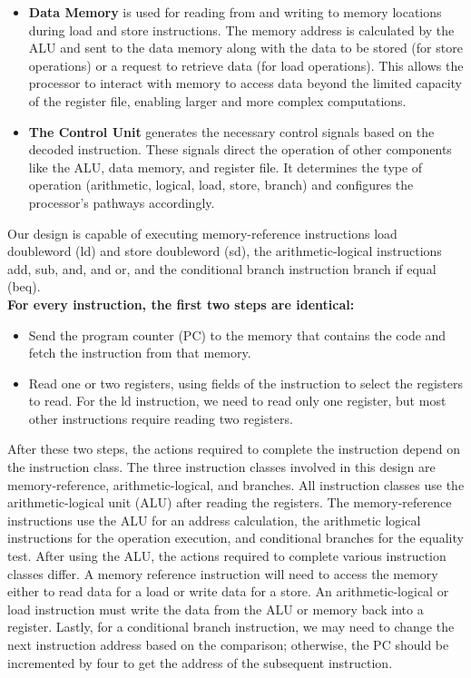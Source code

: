 \begin{itemize}
\item \textbf{Data Memory} is used for reading from and writing to memory locations during load and store instructions. The memory address is calculated by the ALU and sent to the data memory along with the data to be stored (for store operations) or a request to retrieve data (for load operations). This allows the processor to interact with memory to access data beyond the limited capacity of the register file, enabling larger and more complex computations.
\item \textbf{The Control Unit} generates the necessary control signals based on the decoded instruction. These signals direct the operation of other components like the ALU, data memory, and register file. It determines the type of operation (arithmetic, logical, load, store, branch) and configures the processor’s pathways accordingly.
\end{itemize}
Our design is capable of executing memory-reference instructions load doubleword (ld) and store doubleword (sd), the arithmetic-logical instructions add, sub, and, and or, and the conditional branch instruction branch if equal (beq).\\
\vspace{\baselineskip}
\textbf{For every instruction, the first two steps are identical:}
\begin{itemize}
\item Send the program counter (PC) to the memory that contains the code and fetch the instruction from that memory.
\item Read one or two registers, using fields of the instruction to select the registers to read. For the ld instruction, we need to read only one register, but most other instructions require reading two registers.
\end{itemize}
After these two steps, the actions required to complete the instruction depend on the instruction class. The three instruction classes involved in this design are memory-reference, arithmetic-logical, and branches. All instruction classes use the arithmetic-logical unit (ALU) after reading the registers. The memory-reference instructions use the ALU for an address calculation, the arithmetic logical instructions for the operation execution, and conditional branches for the equality test. After using the ALU, the actions required to complete various instruction classes differ. A memory reference instruction will need to access the memory either to read data for a load or write data for a store. An arithmetic-logical or load instruction must write the data from the ALU or memory back into a register. Lastly, for a conditional branch instruction, we may need to change the next instruction address based on the comparison; otherwise, the PC should be incremented by four to get the address of the subsequent instruction.\\
